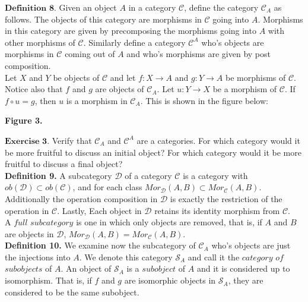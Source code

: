 \documentclass{article}
\theoremstyle{problemstyle}
\begin{document}
$\textbf{Definition 8.}$ Given an object $A$ in a category $\mathcal{C}$, define the category $\mathcal{C}_A$ as follows. The objects of this category are morphisms in $\mathcal{C}$ going into $A$. Morphisms in this category are given by precomposing the morphisms going into $A$ with other morphisms of $\mathcal{C}$. Similarly define a category $\mathcal{C}^A$ who's objects are morphisms in $\mathcal{C}$ coming out of $A$ and who's morphisms are given by post composition.\\ 

Let $X$ and $Y$ be objects of $\mathcal{C}$ and let $f:X \rightarrow A$ and $g:Y \rightarrow A$ be morphisms of $\mathcal{C}$. Notice also that $f$ and $g$ are objects of $\mathcal{C}_A$. Let $u: Y \rightarrow X$ be a morphism of $\mathcal{C}$. If $f\circ u = g$, then $u$ is a morphism in $\mathcal{C}_A$. This is shown in the figure below:\\

\begin{center}
\end{center}
\begin{center}
\textbf{Figure 3.}
\end{center}


$\textbf{Exercise 3.}$ Verify that $\mathcal{C}_A$ and $\mathcal{C}^A$ are a categories. For which category would it be more fruitful to discuss an initial object?  For which category would it be more fruitful to discuss a final object?\\

\textbf{Definition 9.} A subcategory $\mathcal{D}$ of a category $\mathcal{C}$ is a category with $ob(\mathcal{D}) \subset ob(\mathcal{C})$, and for each class $Mor_\mathcal{D}(A,B) \subset Mor_\mathcal{C}(A,B)$. Additionally the operation composition in $\mathcal{D}$ is exactly the restriction of the operation in $\mathcal{C}$. Lastly, Each object in $\mathcal{D}$ retains its identity morphism from $\mathcal{C}$.\\ 

A $full$ $subcategory$ is one in which only objects are removed, that is, if $A$ and $B$ are objects in $\mathcal{D}$, $Mor_\mathcal{D}(A,B) = Mor_\mathcal{C}(A,B)$. \\

\textbf{Definition 10.} We examine now the subcategory of $\mathcal{C}_A$ who's objects are just the injections into $A$. We denote this category $\mathcal{S}_A$ and call it the $category$ $of$ $subobjects$ of $A$. An object of $\mathcal{S}_A$ is a $subobject$ of $A$ and it is considered up to isomorphism. That is, if $f$ and $g$ are isomorphic objects in $\mathcal{S}_A$, they are considered to be the same subobject. \\
\end{document}
